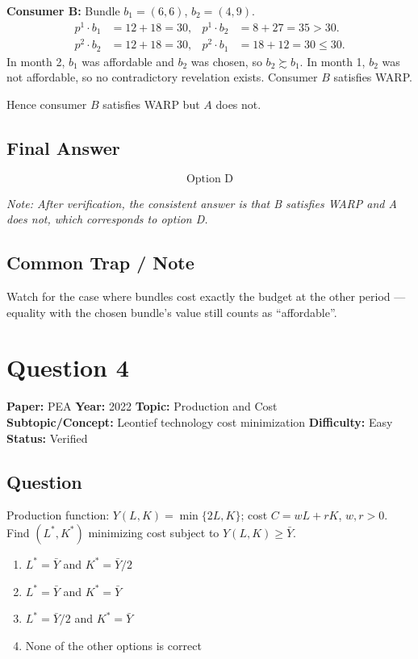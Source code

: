 \documentclass[11pt]{article}
\begin{document}
\textbf{Consumer B:} Bundle $b_1 = (6,6)$, $b_2 = (4,9)$.
\begin{align*}
p^1 \cdot b_1 &= 12+18 = 30, & p^1 \cdot b_2 &= 8+27 = 35 > 30. \\
p^2 \cdot b_2 &= 12+18 = 30, & p^2 \cdot b_1 &= 18+12 = 30 \le 30.
\end{align*}
In month 2, $b_1$ was affordable and $b_2$ was chosen, so $b_2 \succsim b_1$.
In month 1, $b_2$ was not affordable, so no contradictory revelation exists. Consumer $B$
satisfies WARP.

Hence consumer $B$ satisfies WARP but $A$ does not.

\subsection*{Final Answer}
\[
\boxed{\text{Option D}}
\]

\textit{Note: After verification, the consistent answer is that B satisfies WARP and A does not, which corresponds to option D.}

\subsection*{Common Trap / Note}
Watch for the case where bundles cost exactly the budget at the other period --- equality with the chosen bundle's value still counts as ``affordable''.

\section*{Question 4}
\textbf{Paper:} PEA \quad \textbf{Year:} 2022 \quad \textbf{Topic:} Production and Cost \\
\textbf{Subtopic/Concept:} Leontief technology cost minimization \quad \textbf{Difficulty:} Easy \\
\textbf{Status:} Verified

\subsection*{Question}
Production function: $Y(L,K) = \min\{2L, K\}$; cost $C = wL + rK$, $w,r>0$.
Find $(L^*, K^*)$ minimizing cost subject to $Y(L,K) \geq \bar Y$.
\begin{enumerate}[label=(\Alph*)]
\item $L^* = \bar Y$ and $K^* = \bar Y/2$
\item $L^* = \bar Y$ and $K^* = \bar Y$
\item $L^* = \bar Y/2$ and $K^* = \bar Y$
\item None of the other options is correct
\end{enumerate}
\end{document}
